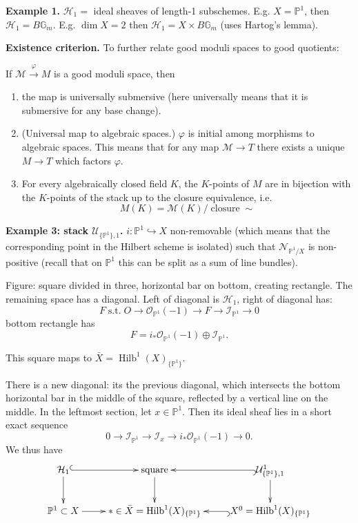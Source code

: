 \medskip\noindent
{\bf Example 1.}
$\mathcal{H}_1=$ ideal sheaves of length-1
subschemes. E.g. $X = \mathbb{P}^1$, then
$\mathcal{H}_1 = B\mathbb{G}_m$.
E.g. $\dim X = 2$ then $\mathcal{H}_1=
X \times B \mathbb{G}_m$ (uses
Hartog's lemma).

\medskip\noindent
{\bf Existence criterion.}
To further relate good moduli spaces
to good quotients:

\begin{theorem}[Alper]
\label{theorem-alper}
If $\mathcal{M} \xrightarrow{\varphi}M$
is a good moduli space, then
\begin{enumerate}
\item the map is universally submersive 
(here universally means that it is
submersive for any base change).

\item (Universal map to algebraic spaces.)
$\varphi$ is initial among morphisms
to algebraic spaces. This means that
for any map $\mathcal{M} \to T$ there exists
a unique $M \to T$ which factors $\varphi$.

\item For every algebraically closed field
$K$, the $K$-points of $M$ are in bijection
with the $K$-points of the stack
up to the closure equivalence, i.e.
$$
M(K) =
\mathcal{M}(K)/\operatorname{closure}\sim
$$

\end{enumerate}
\end{theorem}



\medskip\noindent
{\bf Example 3: stack
$\mathcal{U}_{\{\mathbb{P}^1\},1}$.}
$i:\mathbb{P}^1 \hookrightarrow X$
non-removable (which means that
the corresponding point in the Hilbert
scheme is isolated) such that
$\mathcal{N}_{\mathbb{P}^1/X}$
is non-positive (recall that on $\mathbb{P}^1$
this can be split as a sum of line bundles).

Figure: square divided in three, horizontal
bar on bottom, creating rectangle. The
remaining space has a diagonal. Left of
diagonal is $\mathcal{H}_1$,
right of diagonal has:
$$
F \operatorname{ s.t.}
O \to \mathcal{O}_{\mathbb{P}^1}(-1)
\to F \to \mathcal{I}_{\mathbb{P}^1}
\to 0
$$
bottom rectangle has
$$
F = i_*\mathcal{O}_{\mathbb{P}^1}(-1)
\oplus \mathcal{I}_{\mathbb{P}^1}.
$$

This square maps to $\bar{X}=
\operatorname{Hilb}^1(X)_{\{\mathbb{P}^1\}}$.

There is a new diagonal: its the previous
diagonal, which intersects the bottom
horizontal bar in the middle of the square,
reflected by a vertical line on the middle.
In the leftmost section, let $x \in
\mathbb{P}^1$. Then its ideal sheaf lies
in a short exact sequence
$$
0 \to \mathcal{I}_{\mathbb{P}^1}
\to \mathcal{I}_x
\to i_*\mathcal{O}_{\mathbb{P}^1}(-1)
\to 0.
$$
We thus have
$$
\xymatrix{
\mathcal{H}_1 \ar@{^{(}->}[r]
\ar[d]
&\operatorname{square}\ar[d]
&\mathcal{U}_{\{\mathbb{P}^1\},1}^1
\ar@{^{(}->}[l]\ar[d]\\
\mathbb{P}^1\subset X
\ar[r]
& \ast \in \bar{X} = 
\operatorname{Hilb}^1(X)_{\{\mathbb{P}^1\}}
&X^0=\operatorname{Hilb}^1(X)_{\{\mathbb{P}^1\}}
\ar@{^{(}->}[l]
}
$$




